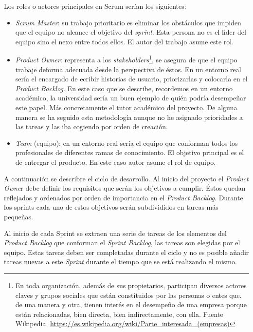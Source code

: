 Los roles o actores principales en Scrum serían los siguientes: 
\begin{itemize}	
	\item \textit{Scrum Master}: su trabajo prioritario es eliminar los obstáculos que impiden que el equipo no alcance el objetivo del \textit{sprint}. Esta persona no es el líder del equipo sino el nexo entre todos ellos. El autor del trabajo asume este rol.
	\item \textit{Product Owner}: representa a los \textit{stakeholders}\footnote{En toda organización, además de sus propietarios, participan diversos actores claves y grupos sociales que están constituidos por las personas o entes que, de una manera y otra, tienen interés en el desempeño de una empresa porque están relacionadas, bien directa, bien indirectamente, con ella. Fuente Wikipedia. \url{https://es.wikipedia.org/wiki/Parte_interesada_(empresas)}}, se asegura de que el equipo trabaje deforma adecuada desde la perspectiva de éstos. En un entorno real sería el encargado de ecribir historias de usuario, priorizarlas y colocarla en el \textit{Product Backlog}. En este caso que se describe, recordemos en un entorno académico, la universidad sería un buen ejemplo de quién podría desempeñar este papel. Más concretamente el tutor académico del proyecto. De alguna manera se ha seguido esta metodología aunque no he asignado prioridades a las tareas y las iba cogiendo por orden de creación.
	\item \textit{Team} (equipo): en un entorno real sería el equipo que conforman todos los profesionales de diferentes ramas de conocimiento. El objetivo principal es el de entregar el producto. En este caso autor asume el rol de equipo.
\end{itemize}

A continuación se describre el ciclo de desarrollo. Al inicio del proyecto el \textit{Product Owne}r debe definir los requisitos que serán los objetivos a cumplir. Éstos quedan reflejados y ordenados por orden de importancia en el \textit{Product Backlog}. Durante los sprints cada uno de estos objetivos serán subdivididos en tareas más pequeñas.


Al inicio de cada Sprint se extraen una serie de tareas de los elementos del \textit{Product Backlog} que conforman el \textit{Sprint Backlog}, las tareas son elegidas por el equipo. Estas tareas deben ser completadas durante el ciclo y no es posible añadir tareas nuevas a este \textit{Sprint} durante el tiempo que se está realizando el mismo.


